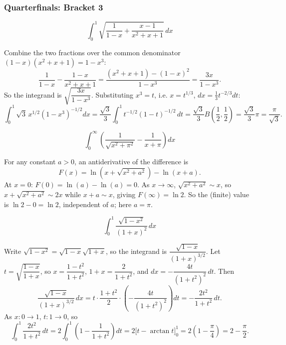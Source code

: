 \subsubsection*{Quarterfinals: Bracket 3}
\begin{questions}

\question \[\int_0^1 \sqrt{\frac{1}{1-x}+\frac{x-1}{x^2+x+1}}\,dx\]
\begin{solution}
Combine the two fractions over the common denominator $(1-x)(x^2+x+1)=1-x^3$:
\[
\frac{1}{1-x}-\frac{1-x}{x^2+x+1}=\frac{(x^2+x+1)-(1-x)^2}{1-x^3}=\frac{3x}{1-x^3}.
\]
So the integrand is $\sqrt{\dfrac{3x}{1-x^3}}$. Substituting $x^3=t$, i.e. $x=t^{1/3}$, $dx=\tfrac13 t^{-2/3}dt$:
\[
\int_0^1\sqrt3\,x^{1/2}(1-x^3)^{-1/2}dx=\frac{\sqrt3}{3}\int_0^1 t^{-1/2}(1-t)^{-1/2}\,dt=\frac{\sqrt3}{3}B\!\left(\frac12,\frac12\right)=\frac{\sqrt3}{3}\pi=\frac{\pi}{\sqrt3}.
\]
\end{solution}

\question \[\int_0^\infty \left(\frac{1}{\sqrt{x^2+\pi^2}}-\frac{1}{x+\pi}\right)dx\]
\begin{solution}
For any constant $a>0$, an antiderivative of the difference is
\[
F(x)=\ln\!\left(x+\sqrt{x^2+a^2}\right)-\ln(x+a).
\]
At $x=0$: $F(0)=\ln(a)-\ln(a)=0$. As $x\to\infty$, $\sqrt{x^2+a^2}\sim x$, so $x+\sqrt{x^2+a^2}\sim 2x$ while $x+a\sim x$, giving $F(\infty)=\ln2$.
So the (finite) value is $\ln2-0=\ln2$, independent of $a$; here $a=\pi$.
\end{solution}

\question \[\int_0^1 \frac{\sqrt{1-x^2}}{(1+x)^2}\,dx\]
\begin{solution}
Write $\sqrt{1-x^2}=\sqrt{1-x}\sqrt{1+x}$, so the integrand is $\dfrac{\sqrt{1-x}}{(1+x)^{3/2}}$.
Let $t=\sqrt{\dfrac{1-x}{1+x}}$, so $x=\dfrac{1-t^2}{1+t^2}$, $1+x=\dfrac{2}{1+t^2}$, and $dx=-\dfrac{4t}{(1+t^2)^2}\,dt$. Then
\[
\frac{\sqrt{1-x}}{(1+x)^{3/2}}\,dx = t\cdot\frac{1+t^2}{2}\cdot\left(-\frac{4t}{(1+t^2)^2}\right)dt=-\frac{2t^2}{1+t^2}\,dt.
\]
As $x:0\to1$, $t:1\to0$, so
\[
\int_0^1 \frac{2t^2}{1+t^2}\,dt=2\int_0^1\left(1-\frac{1}{1+t^2}\right)dt=2\Big[t-\arctan t\Big]_0^1=2\left(1-\frac{\pi}{4}\right)=2-\frac{\pi}{2}.
\]
\end{solution}

\end{questions}

